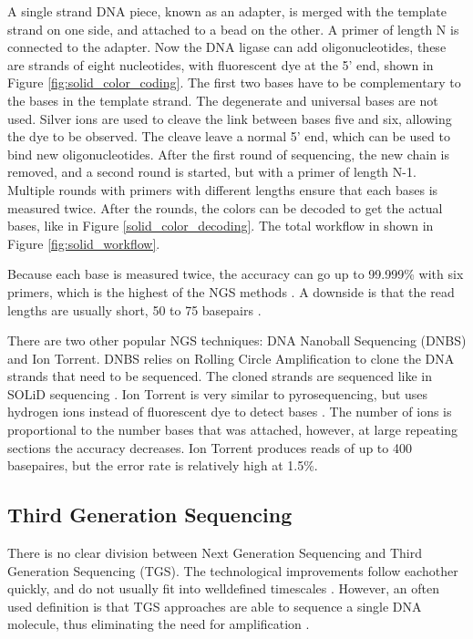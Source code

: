 \documentclass[../main/thesis.tex]{subfiles}
\begin{document}
A single strand DNA piece, known as an adapter, is merged with the template strand on one side, and attached to a bead on the other.
A primer of length N is connected to the adapter.
Now the DNA ligase can add oligonucleotides, these are strands of eight nucleotides, with fluorescent dye at the 5' end, shown in Figure \ref{fig:solid_color_coding}.
The first two bases have to be complementary to the bases in the template strand.
The degenerate and universal bases are not used.
Silver ions are used to cleave the link between bases five and six, allowing the dye to be observed.
The cleave leave a normal 5' end, which can be used to bind new oligonucleotides.
After the first round of sequencing, the new chain is removed, and a second round is started, but with a primer of length N-1.
Multiple rounds with primers with different lengths ensure that each bases is measured twice.
After the rounds, the colors can be decoded to get the actual bases, like in Figure \ref{solid_color_decoding}.
The total workflow in shown in Figure \ref{fig:solid_workflow}.

Because each base is measured twice, the accuracy can go up to 99.999\% with six primers, which is the highest of the NGS methods \cite{ngs_sequencing_atdbio}.
A downside is that the read lengths are usually short, 50 to 75 basepairs \cite{ngs_history}.


There are two other popular NGS techniques: DNA Nanoball Sequencing (DNBS) and Ion Torrent.
DNBS relies on Rolling Circle Amplification to clone the DNA strands that need to be sequenced.
The cloned strands are sequenced like in SOLiD sequencing \cite{ngs_history}.
Ion Torrent is very similar to pyrosequencing, but uses hydrogen ions instead of fluorescent dye to detect bases \cite{ngs_sequencing_atdbio}.
The number of ions is proportional to the number bases that was attached, however, at large repeating sections the accuracy decreases.
Ion Torrent produces reads of up to 400 basepaires, but the error rate is relatively high at 1.5\%.


\subsection{Third Generation Sequencing}
There is no clear division between Next Generation Sequencing and Third Generation Sequencing (TGS).
The technological improvements follow eachother quickly, and do not usually fit into welldefined timescales \cite{window_tgs}.
However, an often used definition is that TGS approaches are able to sequence a single DNA molecule, thus eliminating the need for amplification \cite{history_sequencing}\cite{ngs_sequencing_atdbio}.
\end{document}
